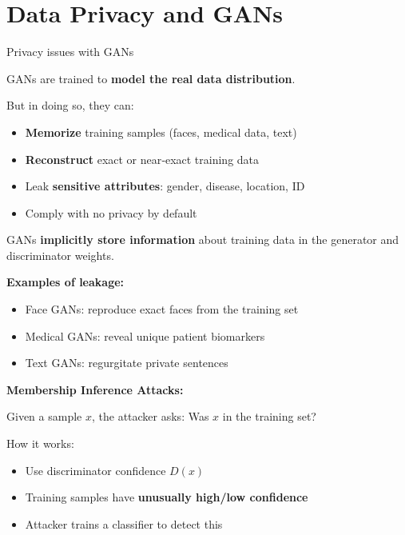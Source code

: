 \documentclass[aspectratio=169,xcolor=dvipsnames,svgnames,x11names,fleqn]{beamer}
\begin{document}
\section{Data Privacy and GANs}

\begin{frame}
    \sectionpage
\end{frame}

\begin{frame}{Privacy issues with GANs}

\scriptsize

GANs are trained to \textbf{model the real data distribution}.

But in doing so, they can:
\begin{itemize}
    \item \textbf{Memorize} training samples (faces, medical data, text)
    \item \textbf{Reconstruct} exact or near‑exact training data
    \item Leak \textbf{sensitive attributes}: gender, disease, location, ID
    \item Comply with no privacy by default
\end{itemize}

\begin{tcolorbox}[]
GANs \textbf{implicitly store information} about training data
in the generator and discriminator weights.
\end{tcolorbox}

\textbf{Examples of leakage:}
\begin{itemize}
    \item Face GANs: reproduce exact faces from the training set
    \item Medical GANs: reveal unique patient biomarkers
    \item Text GANs: regurgitate private sentences
\end{itemize}

\textbf{Membership Inference Attacks:}

Given a sample $x$, the attacker asks: Was $x$  in the training set?

How it works:
\begin{itemize}
    \item Use discriminator confidence $D(x)$
    \item Training samples have \textbf{unusually high/low confidence}
    \item Attacker trains a classifier to detect this
\end{itemize}

\end{frame}
\end{document}
